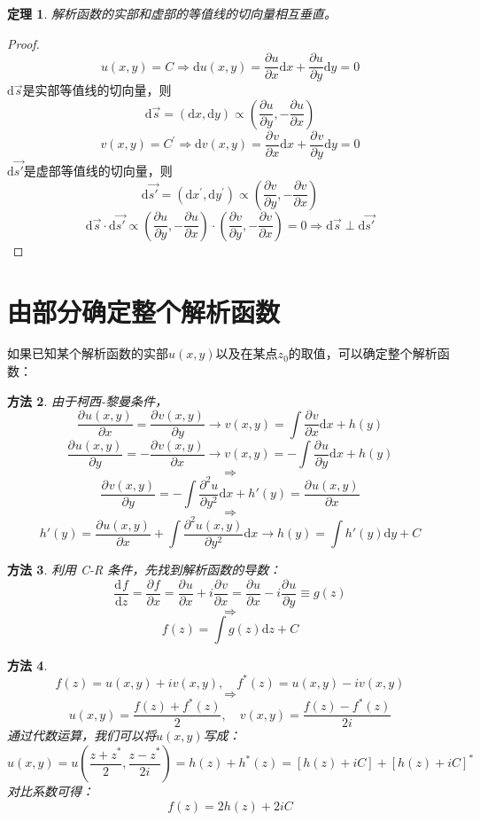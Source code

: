 \documentclass[10pt, a4paper, oneside]{ctexbook}
\newtheorem{theorem}{定理}[section]
\newtheorem{method}[theorem]{方法}
\def\D{\mathrm{d}}
\newcommand{\partdev}[3][]
{\ensuremath{\frac{\displaystyle \partial^{#1} #2}{ \displaystyle \partial #3}}}
\newcommand{\dev}[3][]
{\ensuremath{\frac{\displaystyle \D^{#1} #2}{ \displaystyle \D #3}}}
\begin{document}
\begin{theorem}
    解析函数的实部和虚部的等值线的切向量相互垂直。
\end{theorem}
\begin{proof}
    \begin{equation*}
        u(x, y)=C \Rightarrow \D u(x, y)=\frac{\partial u}{\partial x} \D x+\frac{\partial u}{\partial y} \D y=0
    \end{equation*}
    $\D \vec{s}$是实部等值线的切向量，则
    \begin{equation*}
        \D \vec{s}=(\D x, \D y) \propto\left(\frac{\partial u}{\partial y},-\frac{\partial u}{\partial x}\right)
    \end{equation*}
    \begin{equation*}
        v(x, y)=C^{\prime} \Rightarrow \D v(x,y)=\partdev{v}{x} \D x + \partdev{v}{y}\D y =0
    \end{equation*}
    $\D \vec{s'}$是虚部等值线的切向量，则
    \begin{equation*}
        \D \vec{s'} =\left(\D x^{\prime}, \D y^{\prime}\right) \propto\left(\frac{\partial v}{\partial y},-\frac{\partial v}{\partial x}\right)
    \end{equation*}
    \begin{equation*}
        \D \vec{s} \cdot \D \vec{s'} \propto\left(\frac{\partial u}{\partial y},-\frac{\partial u}{\partial x}\right) \cdot\left(\frac{\partial v}{\partial y},-\frac{\partial v}{\partial x}\right)=0 \Rightarrow \D \vec{s} \perp \D \vec{s'}
    \end{equation*}
\end{proof}
\section{由部分确定整个解析函数}
如果已知某个解析函数的实部$u(x,y)$以及在某点$z_0$的取值，可以确定整个解析函数：
\begin{method}
    由于柯西-黎曼条件，
    $$\partdev{u(x,y)}{x}=\partdev{v(x,y)}{y}\to v(x,y)=\int \partdev{v}{x}\D x + h(y)$$
    $$\partdev{u(x,y)}{y}=-\partdev{v(x,y)}{x}\to v(x,y)=-\int \partdev{u}{y}\D x + h(y)$$
    $$\Rightarrow$$
    $$\partdev{v(x,y)}{y}=-\int \partdev[2]{u}{y^2} \D x+h'(y)=\partdev{u(x,y)}{x}$$
    $$\Rightarrow$$
    $$h'(y)=\partdev{u(x,y)}{x}+\int \partdev[2]{u(x,y)}{y^2}\D x\to h(y)=\int h'(y)\D y + C$$
\end{method}
\begin{method}
    利用 C-R 条件，先找到解析函数的导数：
    $$\dev{f}{z}=\partdev{f}{x}=\partdev{u}{x}+i\partdev{v}{x}=\partdev{u}{x}-i\partdev{u}{y} \equiv g(z)$$
    $$\Rightarrow$$
    $$f(z)=\int g(z)\D z + C$$
\end{method}
\begin{method}
    $$f(z)=u(x,y)+iv(x,y),\quad f^*(z)=u(x,y)-iv(x,y)$$
    $$\Rightarrow$$
    $$u(x,y)=\frac{f(z)+f^*(z)}{2},\quad v(x,y)=\frac{f(z)-f^*(z)}{2i}$$
    通过代数运算，我们可以将$u(x,y)$写成：
    $$u(x,y)=u\left(\frac{z+z^*}{2},\frac{z-z^*}{2i}\right)=h(z)+h^*(z)=\left[h(z)+iC\right]+\left[h(z)+iC\right]^*$$
    对比系数可得：
    $$f(z)=2h(z)+2iC$$
\end{method}
\end{document}
